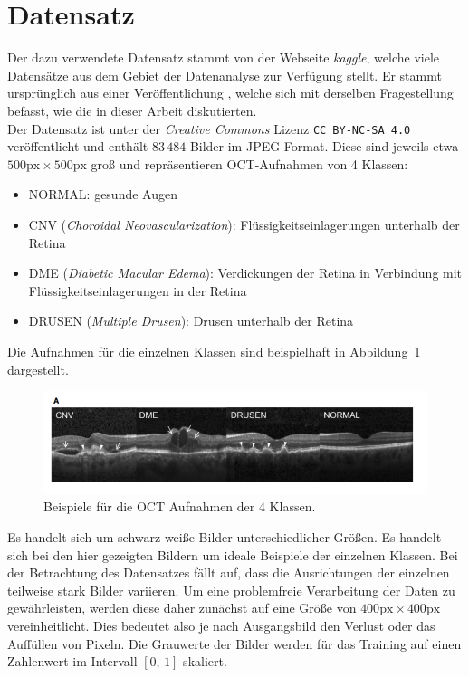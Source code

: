 \section{Datensatz}
%
Der dazu verwendete Datensatz \cite{oct-data} stammt von der Webseite
\textit{kaggle}, welche viele Datensätze aus dem Gebiet der Datenanalyse zur
Verfügung stellt. Er stammt ursprünglich aus einer Veröffentlichung
\cite{paper}, welche sich mit derselben
Fragestellung befasst, wie die in dieser Arbeit diskutierten. \\
Der Datensatz ist unter der \textit{Creative Commons} Lizenz
\texttt{CC BY-NC-SA 4.0} veröffentlicht und enthält $83\,484$ Bilder im
JPEG-Format. Diese sind jeweils etwa $500\text{px}\times500\text{px}$ groß
und repräsentieren OCT-Aufnahmen von 4 Klassen:
%
\begin{itemize}
  \item NORMAL: gesunde Augen
  \item CNV (\textit{Choroidal Neovascularization}): Flüssigkeitseinlagerungen unterhalb der Retina
  \item DME (\textit{Diabetic Macular Edema}): Verdickungen der Retina in Verbindung mit Flüssigkeitseinlagerungen in der Retina
  \item DRUSEN (\textit{Multiple Drusen}): Drusen unterhalb der Retina
\end{itemize}
%
Die Aufnahmen für die einzelnen Klassen sind beispielhaft in
Abbildung~\ref{fig:scans} dargestellt.
%
\begin{figure}
  \centering
  \includegraphics[width=1.1\textwidth]{Plots/title.png}
  \caption{Beispiele für die OCT Aufnahmen der 4 Klassen.}
  \label{fig:scans}
\end{figure}
%
Es handelt sich um schwarz-weiße Bilder unterschiedlicher Größen. Es handelt
sich bei den hier gezeigten Bildern um ideale Beispiele der einzelnen Klassen.
Bei der Betrachtung des Datensatzes fällt auf, dass die Ausrichtungen der
einzelnen teilweise stark Bilder variieren. Um eine problemfreie
Verarbeitung der Daten zu gewährleisten, werden diese daher zunächst auf eine
Größe von $400\text{px}\times400\text{px}$ vereinheitlicht. Dies bedeutet also
je nach Ausgangsbild den Verlust oder das Auffüllen von Pixeln. Die Grauwerte
der Bilder werden für das Training auf einen Zahlenwert im Intervall $[0,\,1]$
skaliert.
